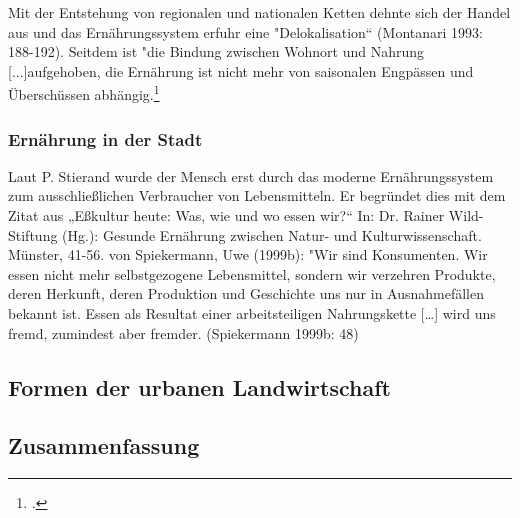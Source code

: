 \documentclass{scrartcl}
\begin{document}
Mit der Entstehung von regionalen und nationalen Ketten dehnte sich der Handel aus und das Ernährungssystem erfuhr eine "Delokalisation“ (Montanari 1993: 188-192). Seitdem ist "die Bindung zwischen Wohnort und Nahrung [...]aufgehoben, die Ernährung ist nicht mehr von saisonalen Engpässen und Überschüssen abhängig.\footcite{Stierand2008StadtLebensmittel, S.122f}

\subsubsection {Ernährung in der Stadt}
  
Laut P. Stierand wurde der Mensch erst durch das moderne Ernährungssystem zum ausschließlichen Verbraucher von Lebensmitteln. Er begründet dies mit dem Zitat aus „Eßkultur heute: Was, wie und wo essen wir?“ In: Dr. Rainer Wild-Stiftung (Hg.): Gesunde Ernährung zwischen Natur- und Kulturwissenschaft. Münster, 41-56. von Spiekermann, Uwe (1999b):
"Wir sind Konsumenten. Wir essen nicht mehr selbstgezogene Lebensmittel, sondern wir verzehren Produkte, deren Herkunft, deren Produktion und Geschichte uns nur in Ausnahmefällen bekannt ist. Essen als Resultat einer arbeitsteiligen Nahrungskette […] wird uns fremd, zumindest aber fremder. (Spiekermann 1999b: 48)

\subsection{Formen der urbanen Landwirtschaft}
\subsection{Zusammenfassung}


\newpage
\listoffigures

\begingroup
\singlespacing
\setlength\bibitemsep{10pt}%
\printbibliography
\endgroup
\end{document}
